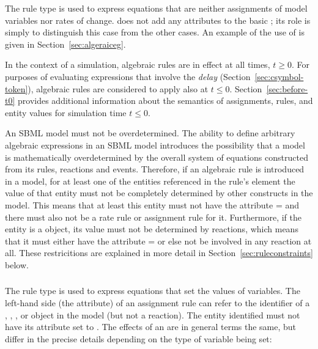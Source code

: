 The rule type \AlgebraicRule is used to express equations that are
neither assignments of model variables nor rates of change.
\AlgebraicRule does not add any attributes to the basic \Rule; its
role is simply to distinguish this case from the other cases.  An
example of the use of \AlgebraicRule is given in
Section~\ref{sec:algeraiceg}.

In the context of a simulation, algebraic rules are in effect at
all times, $t \geq 0$.  For purposes of evaluating expressions
that involve the \emph{delay} 
(Section~\ref{sec:csymbol-token}), algebraic rules are considered
to apply also at $t \leq 0$.  Section~\ref{sec:before-t0} provides
additional information about the semantics of assignments, rules,
and entity values for simulation time $t \leq 0$.

An SBML model must not be overdetermined.  The ability to define
arbitrary algebraic expressions in an SBML model introduces the
possibility that a model is mathematically overdetermined by the
overall system of equations constructed from its rules, reactions
and events.  Therefore, if an algebraic rule is introduced in a
model, for at least one of the entities referenced in the rule's
 element the value of that entity must not be
completely determined by other constructs in the model.  This
means that at least this entity must not have the attribute
= and there must also not be a rate rule
or assignment rule for it.  Furthermore, if the entity is a
\Species object, its value must not be determined by reactions,
which means that it must either have the attribute
= or else not be involved in
any reaction at all.  These restricitions are explained in more
detail in Section~\ref{sec:ruleconstraints} below.


\subsubsection{}
\label{sec:assignmentrule}

The rule type \AssignmentRule is used to express equations that
set the values of variables.  The left-hand side (the
 attribute) of an assignment rule can refer to the
identifier of a \Species, \SpeciesReference, \Compartment, 
or \Parameter object in
the model (but not a reaction).  The entity identified must not
have its  attribute set to .  The effects of
an \AssignmentRule are in general terms the same, but differ in
the precise details depending on the type of variable being set:

